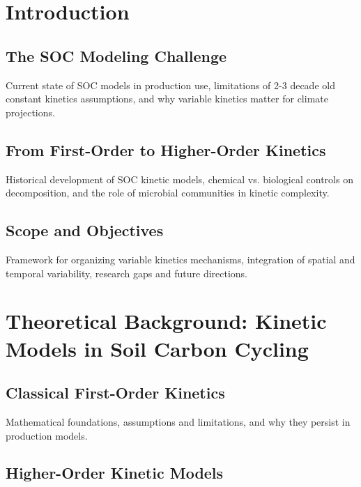 \documentclass[12pt,a4paper]{article}
\begin{document}
\tableofcontents
\newpage  

\section{Introduction} \label{sec:intro}


\subsection{The SOC Modeling Challenge} \label{sec:intro_challenge}

Current state of SOC models in production use, limitations of 2-3 decade old constant kinetics assumptions, and why variable kinetics matter for climate projections.

\subsection{From First-Order to Higher-Order Kinetics} \label{sec:intro_kinetics}

Historical development of SOC kinetic models, chemical vs. biological controls on decomposition, and the role of microbial communities in kinetic complexity.

\subsection{Scope and Objectives} \label{sec:intro_scope}

Framework for organizing variable kinetics mechanisms, integration of spatial and temporal variability, research gaps and future directions.


\section{Theoretical Background: Kinetic Models in Soil Carbon Cycling} \label{sec:theory}

\subsection{Classical First-Order Kinetics} \label{sec:theory_first}

Mathematical foundations, assumptions and limitations, and why they persist in production models.

\subsection{Higher-Order Kinetic Models} \label{sec:theory_higher}
\end{document}
